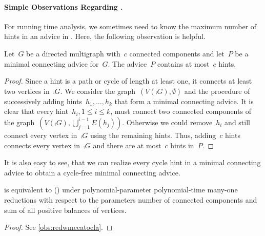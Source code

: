 \paragraph{Simple Observations Regarding \pWMEECAs{}.}
For running time analysis, we sometimes need to know the maximum number of hints in an advice in \pWMEECAs{}. Here, the following observation is helpful.
\begin{observation} \label{obs:hintsinadvice}
  Let~$G$ be a directed multigraph with~$c$ connected components and let~$P$ be a minimal connecting advice for~$G$. The advice~$P$ contains at most~$c$ hints.
\end{observation}
\begin{proof}
  Since a hint is a path or cycle of length at least one, it connects at least two vertices in~$\comp{G}$. We consider the graph~$(V(\comp{G}), \emptyset)$ and the procedure of successively adding hints~$h_1, \ldots, h_k$ that form a minimal connecting advice. It is clear that every hint~$h_i, 1 \leq i \leq k$, must connect two connected components of the graph~$(V(\comp{G}), \bigcup_{j = 1}^{i - 1}E(h_j))$. Otherwise we could remove~$h_i$ and still connect every vertex in~$\comp{G}$ using the remaining hints. Thus, adding~$c$ hints connects every vertex in~$\comp{G}$ and there are at most~$c$ hints in~$P$.
\end{proof}
It is also easy to see, that we can realize every cycle hint in a minimal connecting advice to obtain a cycle-free minimal connecting advice.
\begin{observation}\label{obs:redwmeecatoccla}
  \pWMEECA{} is equivalent to \pWMEECCLA{} (\pWMEECCLAs{}) under polynomial-parameter polynomial-time many-one reductions with respect to the parameters number of connected components and sum of all positive balances of vertices.
\end{observation}
\begin{proof}
  See \autoref{obs:redwmeeatocla}.
\end{proof}




